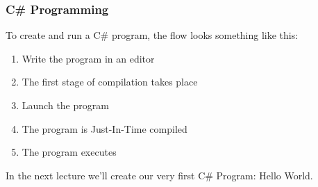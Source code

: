 \begin{frame}
\frametitle{C\# Programming}
To create and run a C\# program, the flow looks something like this:

\begin{enumerate}
	\item Write the program in an editor
	\item The first stage of compilation takes place
	\item Launch the program
	\item The program is Just-In-Time compiled
	\item The program executes
\end{enumerate}

In the next lecture we'll create our very first C\# Program: Hello World.

\end{frame}




